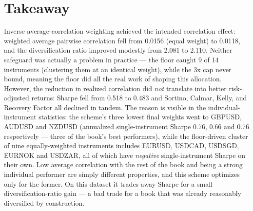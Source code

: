 \documentclass[11pt]{article}
\begin{document}
\section{Takeaway}

Inverse average-correlation weighting achieved the intended correlation effect:
weighted average pairwise correlation fell from 0.0156 (equal weight) to 0.0118,
and the diversification ratio improved modestly from 2.081 to 2.110. Neither
safeguard was actually a problem in practice --- the floor caught 9 of 14
instruments (clustering them at an identical weight), while the 3x cap never
bound, meaning the floor did all the real work of shaping this allocation.
However, the reduction in realized correlation did \emph{not} translate into
better risk-adjusted returns: Sharpe fell from 0.518 to 0.483 and Sortino,
Calmar, Kelly, and Recovery Factor all declined in tandem. The reason is visible
in the individual-instrument statistics: the scheme's three lowest final weights
went to GBPUSD, AUDUSD and NZDUSD (annualized single-instrument Sharpe 0.76,
0.66 and 0.76 respectively --- three of the book's best performers), while the
floor-driven cluster of nine equally-weighted instruments includes EURUSD,
USDCAD, USDSGD, EURNOK and USDZAR, all of which have \emph{negative}
single-instrument Sharpe on their own. Low average correlation with the rest of
the book and being a strong individual performer are simply different
properties, and this scheme optimizes only for the former. On this dataset it
trades away Sharpe for a small diversification-ratio gain --- a bad trade for a
book that was already reasonably diversified by construction.
\end{document}
